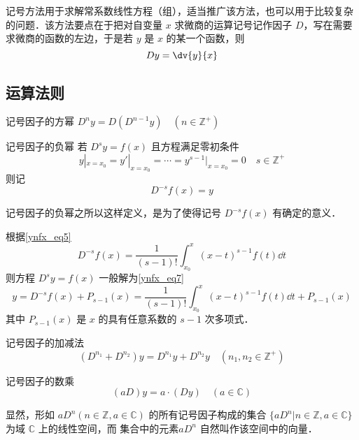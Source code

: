 
记号方法用于求解常系数线性方程（组），适当推广该方法，也可以用于比较复杂的问题．该方法要点在于把对自变量 $x$ 求微商的运算记号记作因子 $D$，写在需要求微商的函数的左边，于是若 $y$ 是 $x$ 的某一个函数，则
\begin{equation}\label{Sign_eq10}
Dy=\dv{y}{x}
\end{equation}
\subsection{运算法则}
\begin{definition}{记号因子的方幂}\label{Sign_def1}
$D^ny=D(D^{n-1}y)\quad(n\in\mathbb{Z^{+}})$
\end{definition}
\begin{definition}{记号因子的负幂}\label{Sign_def2}
若 $D^sy=f(x)$ 且方程满足零初条件
\begin{equation}\label{Sign_eq5}
y|_{x=x_0}=y'|_{x=x_0}=\cdots=y^{s-1}|_{x=x_0}=0\quad{s\in\mathbb{Z^{+}}}
\end{equation}
则记
\begin{equation}
D^{-s}f(x)=y
\end{equation}
\end{definition}
记号因子的负幂之所以这样定义，是为了使得记号 $D^{-s}f(x)$ 有确定的意义．

根据\autoref{ynfx_eq5}~
\begin{equation}\label{Sign_eq9}
D^{-s}f(x)=\frac{1}{(s-1)!}\int_{x_0}^x(x-t)^{s-1}f(t)\dd t
\end{equation}
则方程 $D^sy=f(x)$ 一般解为\autoref{ynfx_eq7}~
\begin{equation}
y=D^{-s}f(x)+P_{s-1}(x)=\frac{1}{(s-1)!}\int_{x_0}^x(x-t)^{s-1}f(t)\dd t+P_{s-1}(x)
\end{equation}
其中 $P_{s-1}(x)$ 是 $x$ 的具有任意系数的 $s-1$ 次多项式．
\begin{definition}{记号因子的加减法}
\begin{equation}
(D^{n_1}+D^{n_2})y=D^{n_1}y+D^{n_2}y\quad(n_1,n_2\in \mathbb{Z^{+
}})
\end{equation}
\end{definition}
\begin{definition}{记号因子的数乘}
\begin{equation}
(aD)y=a\cdot(Dy)\quad(a\in\mathbb{C})
\end{equation}
\end{definition}
显然，形如 $aD^n(n\in \mathbb{Z},a\in\mathbb{C})$ 的所有记号因子构成的集合 $\{aD^n|n\in \mathbb{Z},a\in\mathbb{C}\}$ 为域 $\mathbb C$ 上的线性空间，而 集合中的元素$aD^n$ 自然叫作该空间中的向量．

